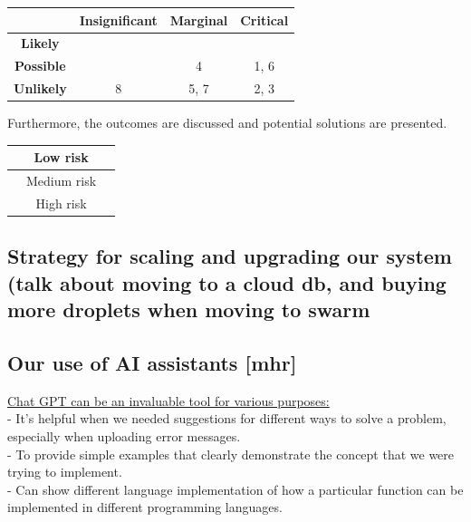 \documentclass{article}
\begin{document}

\begin{table}[h!]
\centering
\small
{} 
\renewcommand{\arraystretch}{1.5} 
\begin{tabular}{|c|c|c|c|}
\hline
\rowcolor{white}
& \textbf{Insignificant} & \textbf{Marginal} & \textbf{Critical} \\
\hline
\textbf{Likely} & \cellcolor{mediumrisk} & \cellcolor{highrisk} & \cellcolor{highrisk} \\
\hline
\textbf{Possible} & \cellcolor{lowrisk} & \cellcolor{mediumrisk} 4 & \cellcolor{highrisk} 1, 6 \\
\hline
\textbf{Unlikely} & \cellcolor{lowrisk} 8 & \cellcolor{lowrisk} 5, 7  & \cellcolor{mediumrisk} 2, 3 \\
\hline
\end{tabular}
\end{table}

Furthermore, the outcomes are discussed and potential solutions are presented. 






\begin{table}[h!]
\centering
\small
{} 
\renewcommand{\arraystretch}{1.5} 
\begin{tabular}{|c|c|c|}
\hline
\cellcolor{lowrisk} & Low risk \\
\hline
\cellcolor{mediumrisk} & Medium risk \\
\hline
\cellcolor{highrisk} & High risk \\
\hline
\end{tabular}
\end{table}



\subsection{Strategy for scaling and upgrading our system (talk about moving to a cloud db, and buying more droplets when moving to swarm}

\subsection{Our use of AI assistants [mhr]}
\noindent \underline{Chat GPT can be an invaluable tool for various purposes:} \\
- It's helpful when we needed suggestions for different ways to solve a problem, especially when uploading error messages.\\
- To provide simple examples that clearly demonstrate the concept that we were trying to implement.\\
- Can show different language implementation of how a particular function can be implemented in different programming languages.
\\
\end{document}
